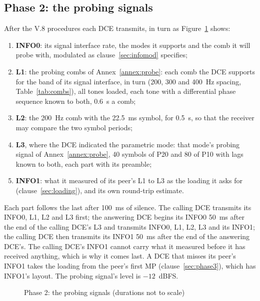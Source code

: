 \documentclass[a4paper,11pt]{article}
\newcounter{annex}
\begin{document}
\subsection{Phase 2: the probing signals}\label{sec:phase2}
After the V.8 procedures each DCE transmits, in turn as
Figure~\ref{fig:probing} shows:
\begin{enumerate}
\item \textbf{INFO0}: its signal interface rate, the modes it supports and
  the comb it will probe with, modulated as clause~\ref{sec:infomod}
  specifies;
\item \textbf{L1}: the probing combs of Annex~\ref{annex:probe}: each
  comb the DCE supports for the band of its signal interface, in turn
  (200, 300 and 400~Hz spacing, Table~\ref{tab:combs}), all tones loaded,
  each tone with a differential phase sequence known to both, 0.6~s a
  comb;
\item \textbf{L2}: the 200~Hz comb with the 22.5~ms symbol, for 0.5~s, so
  that the receiver may compare the two symbol periods;
\item \textbf{L3}, where the DCE indicated the parametric mode: that
  mode's probing signal of Annex~\ref{annex:probe}, 40 symbols of P20
  and 80 of P10 with lags known to both, each part with its preamble;
\item \textbf{INFO1}: what it measured of its peer's L1 to L3 as the
  loading it asks for (clause~\ref{sec:loading}), and its own round-trip
  estimate.
\end{enumerate}
Each part follows the last after 100~ms of silence.  The calling DCE
transmits its INFO0, L1, L2 and L3 first; the answering DCE begins its
INFO0 50~ms after the end of the calling DCE's L3 and transmits INFO0, L1,
L2, L3 and its INFO1; the calling DCE then transmits its INFO1 50~ms after
the end of the answering DCE's.  The calling DCE's INFO1 cannot carry what
it measured before it has received anything, which is why it comes last.
A DCE that misses its peer's INFO1 takes the loading from the peer's
first MP (clause~\ref{sec:phase3}), which has INFO1's layout.  The
probing signal's level is $-12$~dBFS.

\begin{figure}[htbp]
\centering
{}
\caption{Phase 2: the probing signals (durations not to scale)}
\label{fig:probing}
\end{figure}
\end{document}
